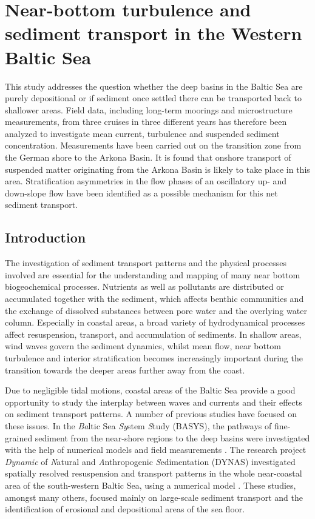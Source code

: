 \chapter{Near-bottom turbulence and sediment transport in the Western Baltic 
Sea}
\label{kap-measure}

This study addresses the question whether the deep basins in the Baltic Sea are 
purely depositional or if sediment once settled there can be transported back 
to shallower areas. Field data, including long-term moorings and 
microstructure measurements, from three cruises in three different years 
has therefore been analyzed to investigate mean current, turbulence 
and suspended sediment concentration. Measurements have been carried out on the 
transition zone from the German shore to the Arkona Basin. It is found that 
onshore transport of suspended matter originating from the Arkona Basin is 
likely to take place in this area. Stratification asymmetries in the flow 
phases of an oscillatory up- and down-slope flow have been identified as a 
possible mechanism for this net sediment transport.

\section{Introduction}\label{introdaten}

The investigation of sediment transport patterns and the physical processes 
involved are essential for the understanding and mapping of many near bottom 
biogeochemical processes. Nutrients as well as pollutants are distributed or 
accumulated together with the sediment, which affects benthic communities and 
the exchange of dissolved substances between pore water and the overlying 
water column. Especially in coastal areas, a broad variety of hydrodynamical 
processes affect resuspension, transport, and accumulation of sediments. In 
shallow areas, wind waves govern the sediment dynamics, whilst mean flow, near 
bottom turbulence and interior stratification becomes increasingly important 
during the transition towards the deeper areas further away from the coast.

Due to negligible tidal motions, coastal areas of the Baltic 
Sea provide a good opportunity to study the interplay between waves and 
currents and their effects on sediment transport patterns. A number of previous 
studies have focused on these issues.
In the \textit{Ba}ltic Sea \textit{Sy}stem \textit{S}tudy (BASYS), the 
pathways of fine-grained sediment from the near-shore regions to the deep 
basins were investigated with the help of numerical models and field 
measurements \citep[][]{basys1, basys2, leipe2000}. The research project 
\textit{Dynamic} of \textit{N}atural and \textit{A}nthropogenic 
\textit{S}edimentation (DYNAS) investigated spatially resolved 
resuspension and transport patterns in the whole near-coastal area of the 
south-western Baltic Sea, using a numerical model 
\citep[][]{dynas1, dynas2}. These studies, amongst many others, focused mainly 
on large-scale sediment transport and the identification of erosional and 
depositional areas of the sea floor. 

